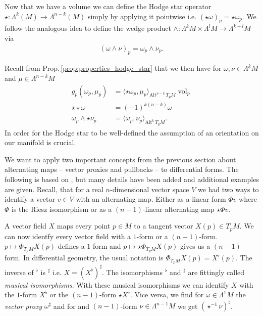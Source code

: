 \documentclass[12pt,a4paper]{article}
\numberwithin{equation}{subsection}
\numberwithin{lemma}{subsection}
\theoremstyle{definition}
\DeclareMathOperator{\vol}{vol}
\newcommand{\alternating}[2]{ {\text{Alt}^{#1}\,#2} }
\begin{document}

Now that we have a volume we can define the Hodge star operator
$\star: \Lambda^k(M) \rightarrow \Lambda^{n-k}(M)$ 
simply by applying it 
pointwise i.e. $(\star \omega)_p = \star \omega_p$. 
We follow the analogous idea to define the wedge product
$\wedge: \Lambda^k M \times \Lambda^l M \rightarrow \Lambda^{k+l} M$ via
\begin{align*}
    (\omega \wedge \nu )_p = \omega_p \wedge \nu_p. 
\end{align*} 

Recall from Prop.\,\ref{prop:properties_hodge_star} that we then have for $\omega, \nu \in \Lambda^k M$ and 
$\mu \in \Lambda^{n-k} M$
\begin{align*}
    g_p(\omega_p, \mu_p) &= \langle \star \omega_p, \mu_p \rangle _{\alternating{n-k}{T_p M}} \vol_p
    \\ \star \star \omega &= (-1)^{k(n-k)} \omega
    \\ \omega_p \wedge \star \nu_p &= \langle \omega_p, \nu_p \rangle _{\alternating{k}{T_p M}}.
\end{align*}
In order for 
the Hodge star to be well-defined the assumption of an orientation on our 
manifold is crucial. 

We want to apply two important concepts from the previous section about 
alternating maps -- vector proxies and pullbacks -- to differential forms.
The following is based on \cite[Ch.\,6]{arnold}, 
but many details have been
added and additional examples are given.
Recall, that for a real $n$-dimensional vector space $V$ we had two 
ways to identify a vector $v\in V$ with an alternating map. Either as a 
linear form $\Phi v$ where $\Phi$ is the Riesz isomorphism or as a 
$(n-1)$-linear alternating map $\star \Phi v$. 

A vector field $X$ maps every point $p \in M$ to a tangent vector 
$X(p) \in T_p M$. We can now identfy every vector field with a $1$-form or 
a $(n-1)$-form. $p \mapsto \Phi_{T_p M} X(p)$ defines a $1$-form and  
$p \mapsto \star \Phi_{T_p M} X(p)$ gives us a $(n-1)$-form. In differential 
geometry, the usual notation is
$\Phi_{T_p M} X(p) = X^\flat(p)$. The inverse of $^\flat$ is $^\sharp$ i.e. 
$X = (X^\flat)^\sharp$.
The isomorphisms $^\flat$ and $^\sharp$ 
are fittingly called \textit{musical isomorphisms}. 
With these musical isomorphisms we can identify $X$ with the $1$-form 
$X^\flat$ or the $(n-1)$-form $\star X^\flat$. Vice versa, we find 
for $\omega \in \Lambda^1 M$ the \textit{vector proxy} $\omega ^\sharp$ and for 
and $(n-1)$-form $\nu \in \Lambda^{n-1} M$ we get $(\star^{-1} \nu)^\sharp$.
\end{document}
